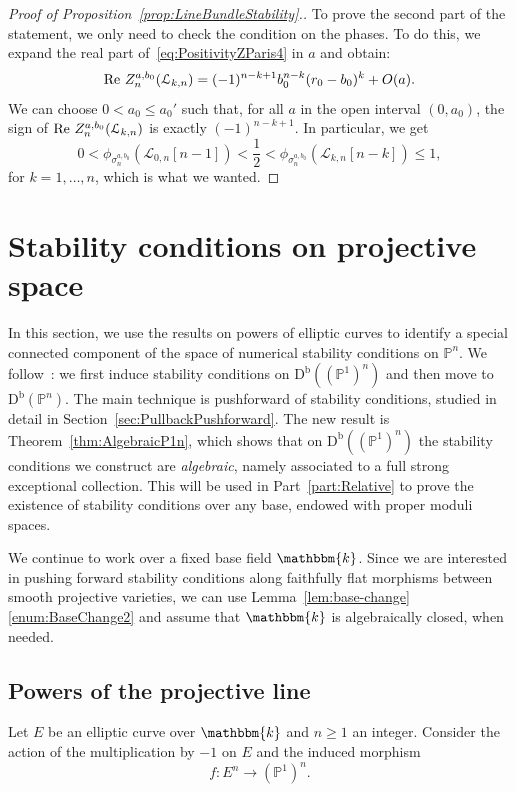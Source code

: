 \documentclass[11pt, reqno]{amsart}
\numberwithin{equation}{section}
\theoremstyle{plain}
\theoremstyle{remark}
\theoremstyle{definition}
\theoremstyle{italicsname}
\def\Re{\mathop{\rm Re}\nolimits}
\newcommand{\Db}{\mathrm{D^b}}
\newcommand{\cL}{\mathcal{L}}
\newcommand{\KK}{\mathbbm{k}}
\def\PP{\ensuremath{\mathbb{P}}}
\begin{document}
\begin{proof}[Proof of Proposition~\ref{prop:LineBundleStability}.]
To prove the second part of the statement, we only need to check the condition on the phases. 
To do this, we expand the real part of~\eqref{eq:PositivityZParis4} in $a$ and obtain:
\[
\Re\, Z_{n}^{a,b_0}(\cL_{k,n})=(-1)^{n-k+1}b_0^{n-k}(r_0-b_0)^k+O(a).
\]
We can choose $0<a_0\leq a_0'$ such that, for all $a$ in the open interval $(0,a_0)$, the sign of $\Re\, Z_{n}^{a,b_0}(\cL_{k,n})$ is exactly $(-1)^{n-k+1}$.
In particular, we get
\[
0<\phi_{\sigma_n^{a,b_0}}(\cL_{0,n}[n-1])<\frac 12<\phi_{\sigma_n^{a,b_0}}(\cL_{k,n}[n-k])\leq1,
\]
for $k=1,\dots,n$, which is what we wanted.
\end{proof}



\section{Stability conditions on projective space}\label{sec:ProjectiveSpace}

In this section, we use the results on powers of elliptic curves to identify a special connected component of the space of numerical stability conditions on $\PP^n$.
We follow~\cite{chunyi-stability}: we first induce stability conditions on $\Db((\PP^1)^n)$ and then move to $\Db(\PP^n)$. The main technique is pushforward of stability conditions, studied in detail in Section~\ref{sec:PullbackPushforward}.
The new result is Theorem~\ref{thm:AlgebraicP1n}, which shows that on $\Db((\PP^1)^n)$ the stability conditions we construct are \emph{algebraic}, namely associated to a full strong exceptional collection. This will be used in Part~\ref{part:Relative} to prove the existence of stability conditions over any base, endowed with proper moduli spaces.

We continue to work over a fixed base field $\KK$.
Since we are interested in pushing forward stability conditions along faithfully flat morphisms between smooth projective varieties, we can use Lemma~\ref{lem:base-change}\ref{enum:BaseChange2} and assume that $\KK$ is algebraically closed, when needed.

\subsection{Powers of the projective line}\label{subsec:P1n} 

Let $E$ be an elliptic curve over $\KK$ and $n\geq1$ an integer.
Consider the action of the multiplication by $-1$ on $E$ and the induced morphism
\[
f\colon E^n\longrightarrow (\PP^1)^n.
\]
\end{document}
